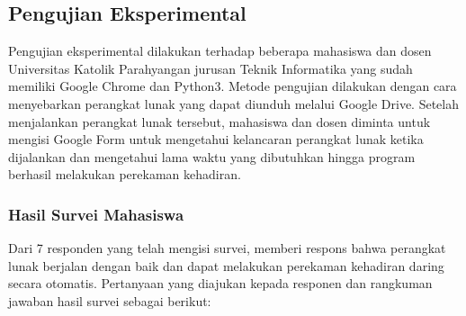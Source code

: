 \newpage
\subsection{Pengujian Eksperimental}
Pengujian eksperimental dilakukan terhadap beberapa mahasiswa dan dosen Universitas Katolik Parahyangan jurusan Teknik Informatika yang sudah memiliki Google Chrome dan Python3. Metode pengujian dilakukan dengan cara menyebarkan perangkat lunak yang dapat diunduh melalui Google Drive. Setelah menjalankan perangkat lunak tersebut, mahasiswa dan dosen diminta untuk mengisi Google Form untuk mengetahui kelancaran perangkat lunak ketika dijalankan dan mengetahui lama waktu yang dibutuhkan hingga program berhasil melakukan perekaman kehadiran. 

\subsubsection{Hasil Survei Mahasiswa}
Dari 7 responden yang telah mengisi survei, memberi respons bahwa perangkat lunak berjalan dengan baik dan dapat melakukan perekaman kehadiran daring secara otomatis. Pertanyaan yang diajukan kepada responen dan rangkuman jawaban hasil survei sebagai berikut:
